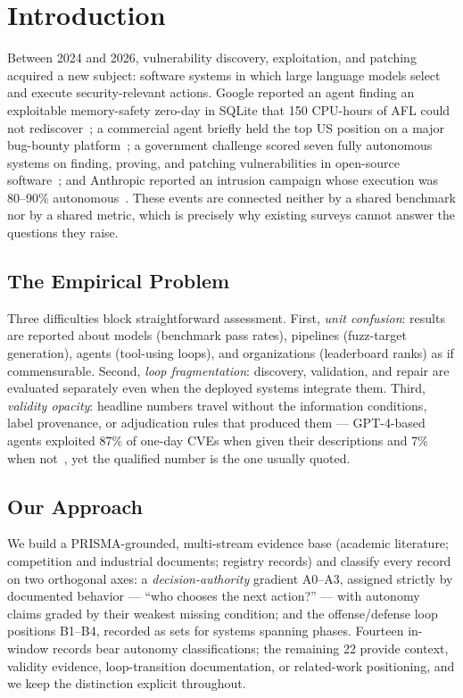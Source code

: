 \section{Introduction}
\label{sec:intro}

Between 2024 and 2026, vulnerability discovery, exploitation, and patching acquired a new
subject: software systems in which large language models select and execute security-relevant
actions. Google reported an agent finding an exploitable memory-safety zero-day in SQLite that
150 CPU-hours of AFL could not rediscover~\cite{bigsleep2024naptime}; a commercial agent
briefly held the top US position on a major bug-bounty platform~\cite{xbowtop12025}; a
government challenge scored seven fully autonomous systems on finding, proving, and patching
vulnerabilities in open-source software~\cite{darparesults2025,r7sokaixcc2026}; and Anthropic
reported an intrusion campaign whose execution was 80--90\% autonomous~\cite{anthropicgtg2025}.
These events are connected neither by a shared benchmark nor by a shared metric, which is
precisely why existing surveys cannot answer the questions they raise.

\subsection{The Empirical Problem}
Three difficulties block straightforward assessment. First, \emph{unit confusion}: results are
reported about models (benchmark pass rates), pipelines (fuzz-target generation), agents
(tool-using loops), and organizations (leaderboard ranks) as if commensurable. Second,
\emph{loop fragmentation}: discovery, validation, and repair are evaluated separately even when
the deployed systems integrate them. Third, \emph{validity opacity}: headline numbers travel
without the information conditions, label provenance, or adjudication rules that produced them
--- GPT-4-based agents exploited 87\% of one-day CVEs when given their descriptions and 7\%
when not~\cite{fang2024agents}, yet the qualified number is the one usually quoted.

\subsection{Our Approach}
We build a PRISMA-grounded, multi-stream evidence base (academic literature; competition and
industrial documents; registry records) and classify every record on two orthogonal axes:
a \emph{decision-authority} gradient A0--A3, assigned strictly by documented behavior ---
``who chooses the next action?'' --- with autonomy claims graded by their weakest missing
condition; and the offense/defense loop positions B1--B4, recorded as sets for systems spanning
phases. Fourteen in-window records bear autonomy classifications; the remaining 22 provide
context, validity evidence, loop-transition documentation, or related-work positioning, and we
keep the distinction explicit throughout.

